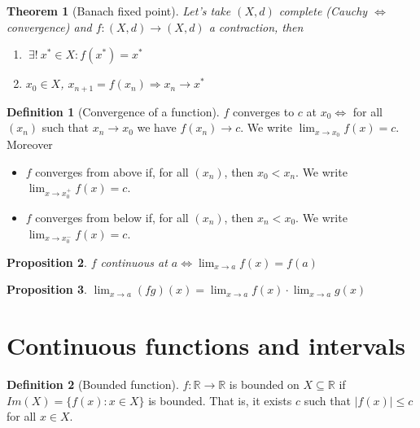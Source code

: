 \documentclass{article}
\newcommand{\DS}{\displaystyle}
\newcommand{\abs}[1]{\left|#1\right|}
\newcommand{\Ar}{\Rightarrow}
\newenvironment{enumrom}{\begin{enumerate}[label=(\roman*)]}{\end{enumerate}}
\newcommand{\f}[3]{#1 : #2 \rightarrow #3}
\newcommand{\fOnR}[1]{#1 : \mathbb{R} \rightarrow \mathbb{R}}
\newcommand{\limx}[1]{\lim_{x \to #1}}
\theoremstyle{definition}
\newtheorem{definition}{Definition}[section]
\theoremstyle{definition}
\theoremstyle{plain}
\newtheorem{theorem}{Theorem}[section]
\theoremstyle{plain}
\theoremstyle{plain}
\theoremstyle{plain}
\newtheorem{proposition}[theorem]{Proposition}
\theoremstyle{definition}
\theoremstyle{remark}
\theoremstyle{remark}
\theoremstyle{remark}
\theoremstyle{remark}
\newcommand{\R}{\mathbb{R}}
\newcommand{\ExistsI}{\ \exists! \ }
\begin{document}
\begin{theorem}[Banach fixed point]
  Let's take $(X,d)$ complete (Cauchy $\iff$ convergence) and $\f{f}{(X,d)}{(X,d)}$ a contraction, then
  \begin{enumrom}
    \item $\ExistsI x^* \in X : f(x^*) = x^*$
    \item $x_0 \in X$, $x_{n+1} = f(x_n) \Ar x_n \to x^*$
  \end{enumrom}
\end{theorem}


\begin{definition}[Convergence of a function]
  $f$ converges to $c$ at $x_0 \iff$ for all $(x_n)$ such that $x_n \to x_0$ we have $f(x_n) \to c$. We write $\DS \limx{x_0} f(x) = c$. Moreover
  \begin{itemize}
    \item $f$ converges from above if, for all $(x_n)$, then $x_0 < x_n$.
    We write $\DS \limx{x_0^+} f(x) = c$.
    \item $f$ converges from below if, for all $(x_n)$, then $x_n < x_0$.
    We write $\DS \limx{x_0^-} f(x) = c$.
  \end{itemize}
\end{definition}




\begin{proposition}
  $f$ continuous at $\DS a \iff \limx{a} f(x) = f(a)$
\end{proposition}


\begin{proposition}
  $\DS \limx{a} (fg)(x) = \limx{a} f(x) \cdot \limx{a} g(x)$
\end{proposition}


\section{Continuous functions and intervals}


\begin{definition}[Bounded function]
  $\fOnR{f}$ is bounded on $X \subseteq \R$ if $Im(X) = \{ f(x) : x \in X \}$ is bounded. That is, it exists $c$ such that $\abs{f(x)} \leq c$ for all $x \in X$.
\end{definition}
\end{document}
